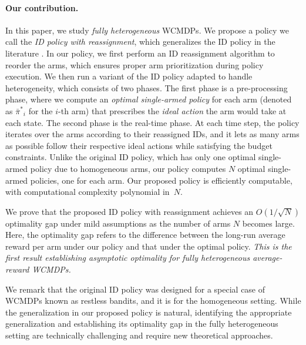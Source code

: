 \documentclass{article}
\theoremstyle{plain}
\theoremstyle{remark}
\newcommand{\pibar}{{\sysbar{\pi}}}
\newcommand{\pibs}{{\pibar^*}}
\newcommand{\sysbar}[1]{\bar{#1}}
\begin{document}
\paragraph{Our contribution.}
In this paper, we study \emph{fully heterogeneous} WCMDPs.
We propose a policy we call the \emph{ID policy with reassignment}, which generalizes the ID policy in the literature \citep{HonXieChe_24}.
In our policy, we first perform an ID reassignment algorithm to reorder the arms, which ensures proper arm prioritization during policy execution.
We then run a variant of the ID policy adapted to handle heterogeneity, which consists of two phases.
The first phase is a pre-processing phase, where we compute an \emph{optimal single-armed policy} for each arm (denoted as $\pibs_i$ for the $i$-th arm) that prescribes the \emph{ideal action} the arm would take at each state.
The second phase is the real-time phase.
At each time step, the policy iterates over the arms according to their reassigned IDs, and it lets as many arms as possible follow their respective ideal actions while satisfying the budget constraints. 
Unlike the original ID policy, which has only one optimal single-armed policy due to homogeneous arms, our policy computes $N$ optimal single-armed policies, one for each arm.  
Our proposed policy is efficiently computable, with computational complexity polynomial in~$N$.



We prove that the proposed ID policy with reassignment achieves an $O(1/\sqrt{N})$ optimality gap under mild assumptions as the number of arms $N$ becomes large.
Here, the optimality gap refers to the difference between the long-run average reward per arm under our policy and that under the optimal policy.
\emph{This is the first result establishing asymptotic optimality for fully heterogeneous average-reward WCMDPs.}

We remark that the original ID policy was designed for a special case of WCMDPs known as restless bandits, and it is for the homogeneous setting.
While the generalization in our proposed policy is natural, identifying the appropriate generalization and establishing its optimality gap in the fully heterogeneous setting are technically challenging and require new theoretical approaches.
\end{document}
